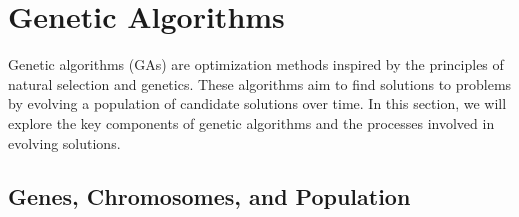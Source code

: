 

    \section{Genetic Algorithms} \label{sec:ga}
    
    Genetic algorithms (GAs) are optimization methods inspired by the principles of natural selection and genetics\cite{holland1992adaptation}. These algorithms aim to find solutions to problems by evolving a population of candidate solutions over time. In this section, we will explore the key components of genetic algorithms and the processes involved in evolving solutions.
    
    \subsection{Genes, Chromosomes, and Population}
    
